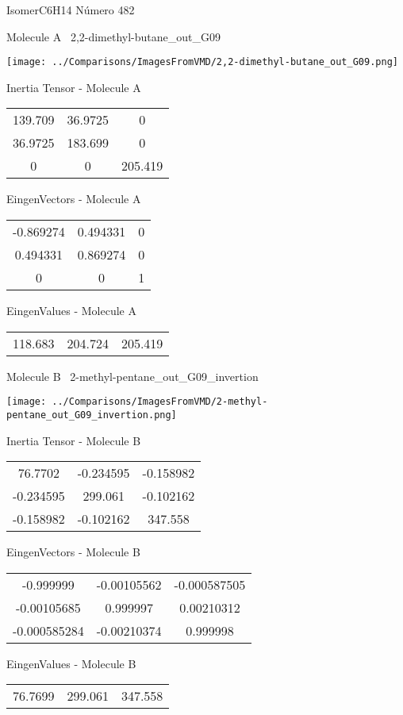 \vtab[-3cm]
\begin{center}
{\large IsomerC6H14 \tab Número 482}
\end{center}
\begin{multicols}{2}
\begin{center}

Molecule A \
2,2-dimethyl-butane\_out\_G09

\texttt{[image: ../Comparisons/ImagesFromVMD/2,2-dimethyl-butane\_out\_G09.png]}

Inertia Tensor - Molecule A \\
\begin{tabular}{|c c c|}
139.709	 & 	36.9725	 & 	0	 \\
36.9725	 & 	183.699	 & 	0	 \\
0	 & 	0	 & 	205.419
\end{tabular}

\vtab
 EingenVectors - Molecule A     \\
\begin{tabular}{|c c c|}
-0.869274	 & 	0.494331	 & 	0	 \\
0.494331	 & 	0.869274	 & 	0	 \\
0	 & 	0	 & 	1
\end{tabular}

\vtab
 EingenValues - Molecule A     \\
\begin{tabular}{|c c c|}
118.683	 & 	204.724	 & 	205.419	 \\
\end{tabular}
\columnbreak

Molecule B \
2-methyl-pentane\_out\_G09\_invertion

\texttt{[image: ../Comparisons/ImagesFromVMD/2-methyl-pentane\_out\_G09\_invertion.png]}

Inertia Tensor - Molecule B \\
\begin{tabular}{|c c c|}
76.7702	 & 	-0.234595	 & 	-0.158982	 \\
-0.234595	 & 	299.061	 & 	-0.102162	 \\
-0.158982	 & 	-0.102162	 & 	347.558
\end{tabular}

\vtab
 EingenVectors - Molecule B     \\
\begin{tabular}{|c c c|}
-0.999999	 & 	-0.00105562	 & 	-0.000587505	 \\
-0.00105685	 & 	0.999997	 & 	0.00210312	 \\
-0.000585284	 & 	-0.00210374	 & 	0.999998
\end{tabular}

\vtab
 EingenValues - Molecule B     \\
\begin{tabular}{|c c c|}
76.7699	 & 	299.061	 & 	347.558	 \\
\end{tabular}

\end{center}
\end{multicols}

